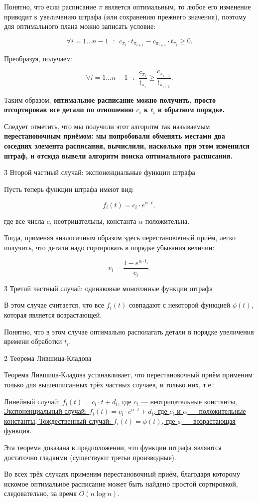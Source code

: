 Понятно, что если расписание $\pi$ является оптимальным, то любое его изменение приводит к увеличению штрафа (или сохранению прежнего значения), поэтому для оптимального плана можно записать условие:

$$ \forall i=1 \ldots n-1 ~~~:~~ c_{\pi_i} \cdot t_{\pi_{i+1}} - c_{\pi_{i+1}} \cdot t_{\pi_i} \ge 0. $$

Преобразуя, получаем:

$$ \forall i=1 \ldots n-1 ~~~:~~ \frac{ c_{\pi_i} }{ t_{\pi_i} } \ge \frac{ c_{\pi_{i+1}} }{ t_{\pi_{i+1}} }. $$

Таким образом, \bf{оптимальное расписание} можно получить, просто \bf{отсортировав} все детали по отношению $c_i$ к $t_i$ в обратном порядке.

Следует отметить, что мы получили этот алгоритм так называемым \bf{перестановочным приёмом}: мы попробовали обменять местами два соседних элемента расписания, вычислили, насколько при этом изменился штраф, и отсюда вывели алгоритм поиска оптимального расписания.


\h3{ Второй частный случай: экспоненциальные функции штрафа }

Пусть теперь функции штрафа имеют вид:

$$ f_i(t) = c_i \cdot e^{\alpha \cdot t}, $$

где все числа $c_i$ неотрицательны, константа $\alpha$ положительна.

Тогда, применяя аналогичным образом здесь перестановочный приём, легко получить, что детали надо сортировать в порядке убывания величин:

$$ v_i = \frac{ 1 - e^{ \alpha \cdot t_i } }{ c_i }. $$


\h3{ Третий частный случай: одинаковые монотонные функции штрафа }

В этом случае считается, что все $f_i(t)$ совпадают с некоторой функцией $\phi(t)$, которая является возрастающей.

Понятно, что в этом случае оптимально располагать детали в порядке увеличения времени обработки $t_i$.


\h2{ Теорема Лившица-Кладова }

Теорема Лившица-Кладова устанавливает, что перестановочный приём применим только для вышеописанных трёх частных случаев, и только них, т.е.:

\ul{
\li Линейный случай: $f_i(t) = c_i \cdot t + d_i$, где $c_i$ --- неотрицательные константы,
\li Экспоненциальный случай: $f_i(t) = c_i \cdot e^{\alpha \cdot t} + d_i$, где $c_i$ и $\alpha$ --- положительные константы,
\li Тождественный случай: $f_i(t) = \phi(t)$, где $\phi$ --- возрастающая функция.
}

Эта теорема доказана в предположении, что функции штрафа являются достаточно гладкими (существуют третьи производные).

Во всех трёх случаях применим перестановочный приём, благодаря которому искомое оптимальное расписание может быть найдено простой сортировкой, следовательно, за время $O (n \log n)$.


